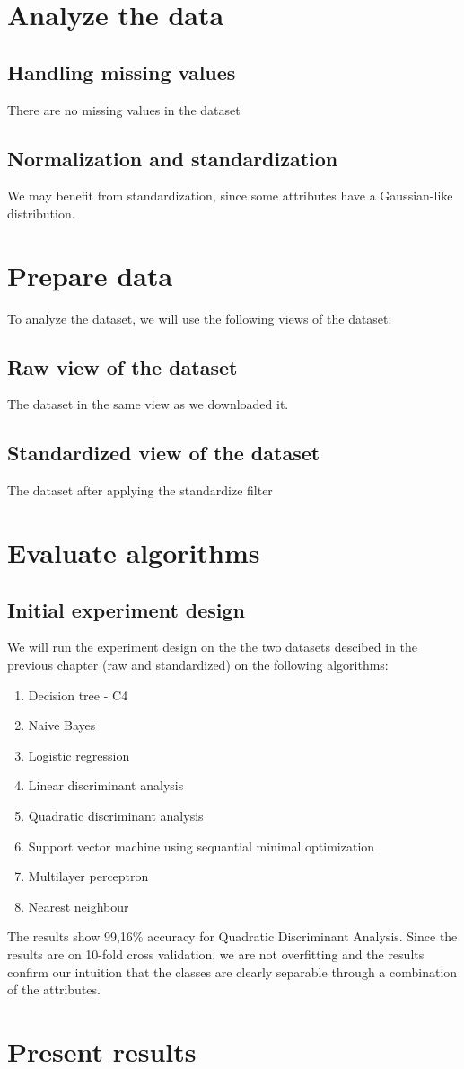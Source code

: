 \chapter{Analyze the data}
\section{Handling missing values}
There are no missing values in the dataset
\section{Normalization and standardization}
We may benefit from standardization, since some attributes have a Gaussian-like distribution.

\chapter{Prepare data}
To analyze the dataset, we will use the following views of the dataset:
\section{Raw view of the dataset}
The dataset in the same view as we downloaded it.
\section{Standardized view of the dataset}
The dataset after applying the standardize filter

\chapter{Evaluate algorithms}
\section{Initial experiment design}
We will run the experiment design on the the two datasets descibed in the previous chapter (raw and standardized) on the following algorithms:
\begin{enumerate}
    \item Decision tree - C4
    \item Naive Bayes
    \item Logistic regression
    \item Linear discriminant analysis
    \item Quadratic discriminant analysis
    \item Support vector machine using sequantial minimal optimization
    \item Multilayer perceptron 
    \item Nearest neighbour
\end{enumerate}
The results show 99,16\% accuracy for Quadratic Discriminant Analysis. Since the results are on 10-fold cross validation, we are not overfitting and the results confirm our intuition that the classes are clearly separable through a combination of the attributes.

\chapter{Present results}